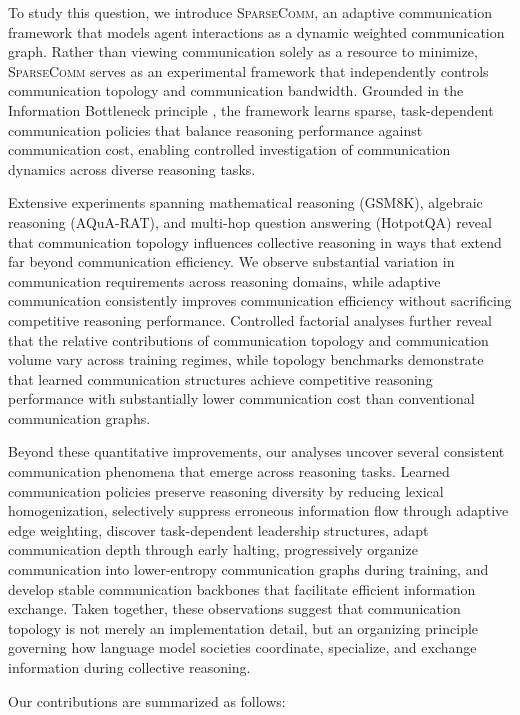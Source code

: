 \documentclass[11pt]{article}
\newcommand{\sys}{\textsc{SparseComm}\xspace}
\begin{document}
To study this question, we introduce \sys, an adaptive communication framework that models agent interactions as a dynamic weighted communication graph. Rather than viewing communication solely as a resource to minimize, \sys serves as an experimental framework that independently controls communication topology and communication bandwidth. Grounded in the Information Bottleneck principle \citep{7133169,abdelaleem2025deep}, the framework learns sparse, task-dependent communication policies that balance reasoning performance against communication cost, enabling controlled investigation of communication dynamics across diverse reasoning tasks.

Extensive experiments spanning mathematical reasoning (GSM8K), algebraic reasoning (AQuA-RAT), and multi-hop question answering (HotpotQA) reveal that communication topology influences collective reasoning in ways that extend far beyond communication efficiency. We observe substantial variation in communication requirements across reasoning domains, while adaptive communication consistently improves communication efficiency without sacrificing competitive reasoning performance. Controlled factorial analyses further reveal that the relative contributions of communication topology and communication volume vary across training regimes, while topology benchmarks demonstrate that learned communication structures achieve competitive reasoning performance with substantially lower communication cost than conventional communication graphs.

Beyond these quantitative improvements, our analyses uncover several consistent communication phenomena that emerge across reasoning tasks. Learned communication policies preserve reasoning diversity by reducing lexical homogenization, selectively suppress erroneous information flow through adaptive edge weighting, discover task-dependent leadership structures, adapt communication depth through early halting, progressively organize communication into lower-entropy communication graphs during training, and develop stable communication backbones that facilitate efficient information exchange. Taken together, these observations suggest that communication topology is not merely an implementation detail, but an organizing principle governing how language model societies coordinate, specialize, and exchange information during collective reasoning.

Our contributions are summarized as follows:
\end{document}
